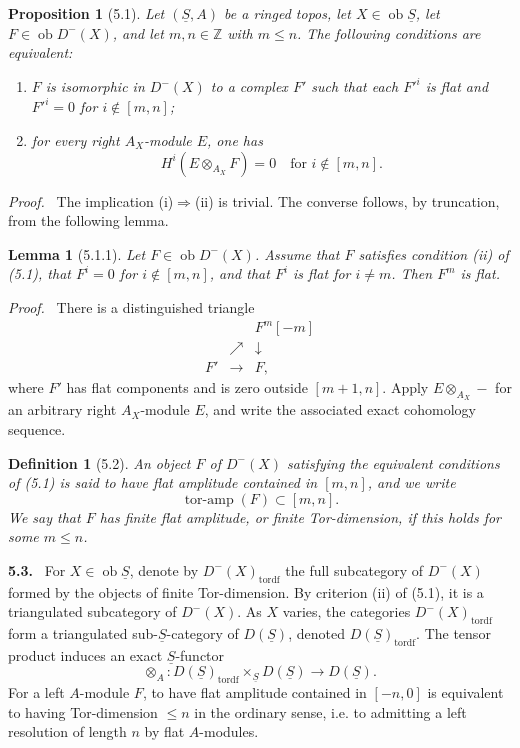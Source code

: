 \documentclass[13pt]{extarticle}
\newcommand{\ZZ}{\mathbb Z}
\newcommand{\uS}{\underline S}
\newcommand{\ob}{\operatorname{ob}}
\newenvironment{statement}[1]{\par\medskip\noindent\textbf{#1.}\ }{\par\medskip}
\newenvironment{prooftext}[1][Proof]{\par\noindent\emph{#1.}\ }{\par\medskip}
\newtheorem*{lemma*}{Lemma}
\newtheorem*{proposition*}{Proposition}
\newtheorem*{definition*}{Definition}
\begin{document}
\begin{proposition*}[5.1]
Let $(\uS,A)$ be a ringed topos, let $X\in\ob\uS$, let $F\in\ob D^-(X)$, and let $m,n\in\ZZ$ with $m\leq n$. The following conditions are equivalent:
\begin{enumerate}[label=(\roman*)]
\item $F$ is isomorphic in $D^-(X)$ to a complex $F'$ such that each $F'^i$ is flat and $F'^i=0$ for $i\notin[m,n]$;
\item for every right $A_X$-module $E$, one has
\[
H^i(E\otimes_{A_X}F)=0\quad\text{for }i\notin[m,n].
\]
\end{enumerate}
\end{proposition*}

\begin{prooftext}
The implication (i)$\Rightarrow$(ii) is trivial. The converse follows, by truncation, from the following lemma.
\end{prooftext}

\begin{lemma*}[5.1.1]
Let $F\in\ob D^-(X)$. Assume that $F$ satisfies condition (ii) of (5.1), that $F^i=0$ for $i\notin[m,n]$, and that $F^i$ is flat for $i\ne m$. Then $F^m$ is flat.
\end{lemma*}

\begin{prooftext}
There is a distinguished triangle
\[
\begin{array}{ccc}
&&F^m[-m]\\
&\nearrow&\downarrow\\
F'&\longrightarrow&F,
\end{array}
\]
where $F'$ has flat components and is zero outside $[m+1,n]$. Apply $E\otimes_{A_X}-$ for an arbitrary right $A_X$-module $E$, and write the associated exact cohomology sequence.
\end{prooftext}

\begin{definition*}[5.2]
An object $F$ of $D^-(X)$ satisfying the equivalent conditions of (5.1) is said to have \emph{flat amplitude} contained in $[m,n]$, and we write
\[
\operatorname{tor\text{-}amp}(F)\subset[m,n].
\]
We say that $F$ has finite flat amplitude, or finite Tor-dimension, if this holds for some $m\leq n$.
\end{definition*}

\begin{statement}{5.3}
For $X\in\ob\uS$, denote by $D^-(X)_{\mathrm{tordf}}$ the full subcategory of $D^-(X)$ formed by the objects of finite Tor-dimension. By criterion (ii) of (5.1), it is a triangulated subcategory of $D^-(X)$. As $X$ varies, the categories $D^-(X)_{\mathrm{tordf}}$ form a triangulated sub-$\uS$-category of $D(\uS)$, denoted $D(\uS)_{\mathrm{tordf}}$. The tensor product induces an exact $\uS$-functor
\[
\otimes_A:D(\uS)_{\mathrm{tordf}}\times_{\uS}D(\uS)
\longrightarrow D(\uS).
\]
For a left $A$-module $F$, to have flat amplitude contained in $[-n,0]$ is equivalent to having Tor-dimension $\leq n$ in the ordinary sense, i.e. to admitting a left resolution of length $n$ by flat $A$-modules.
\end{statement}
\end{document}
